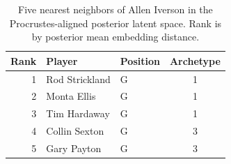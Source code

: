 \begin{table}[htbp]
  \centering\small
  \begin{tabular}{rllc}
    \toprule
    Rank & Player & Position & Archetype \\
    \midrule
    1 & Rod Strickland & G & 1 \\
    2 & Monta Ellis & G & 1 \\
    3 & Tim Hardaway & G & 1 \\
    4 & Collin Sexton & G & 3 \\
    5 & Gary Payton & G & 3 \\
    \bottomrule
  \end{tabular}
  \caption{Five nearest neighbors of Allen Iverson in the Procrustes-aligned posterior latent space. Rank is by posterior mean embedding distance.}
  \label{tab:Allen_Iverson_neighbors}
\end{table}

